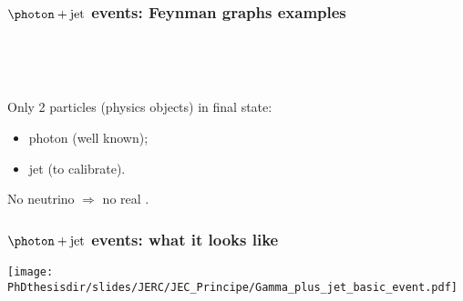 \begin{frame}
\frametitle{$\photon+\text{jet}$ events: Feynman graphs examples}
~\hfill

\hfill\hfill\hfill

\hfill\hfill\hfill

\hfill~

\pause
\vfill

\manip Only 2 \og particles \fg{} (physics objects) in final state:
\begin{itemize}
\item photon (well known);
\item jet (to calibrate).
\end{itemize}
\manip No neutrino $\Rightarrow$ no real \MET.
\end{frame}

\begin{frame}
\frametitle{$\photon+\text{jet}$ events: what it looks like}
\begin{center}
\texttt{[image: \\PhDthesisdir/slides/JERC/JEC\_Principe/Gamma\_plus\_jet\_basic\_event.pdf]}
\end{center}
\end{frame}
